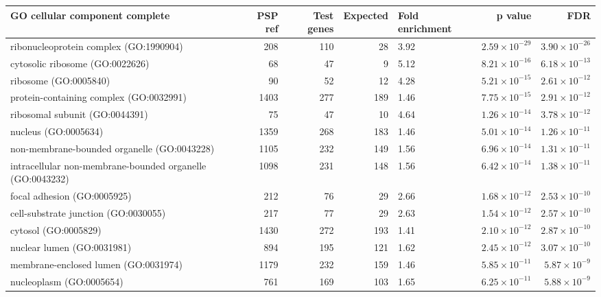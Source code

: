 \begin{table}[ht]
\centering
\begin{adjustbox}{width=\textwidth}

\begin{tabular}{lrrrlrr}
  \hline
GO cellular component complete & PSP ref & Test genes & Expected & Fold enrichment & p value & FDR \\ 
  \hline
ribonucleoprotein complex (GO:1990904) & 208 & 110 & 28 & 3.92 & $2.59 \times 10^{-29}$ & $3.90 \times 10^{-26}$ \\ 
  cytosolic ribosome (GO:0022626) & 68 & 47 & 9 & 5.12 & $8.21 \times 10^{-16}$ & $6.18 \times 10^{-13}$ \\ 
  ribosome (GO:0005840) & 90 & 52 & 12 & 4.28 & $5.21 \times 10^{-15}$ & $2.61 \times 10^{-12}$ \\ 
  protein-containing complex (GO:0032991) & 1403 & 277 & 189 & 1.46 & $7.75 \times 10^{-15}$ & $2.91 \times 10^{-12}$ \\ 
  ribosomal subunit (GO:0044391) & 75 & 47 & 10 & 4.64 & $1.26 \times 10^{-14}$ & $3.78 \times 10^{-12}$ \\ 
  nucleus (GO:0005634) & 1359 & 268 & 183 & 1.46 & $5.01 \times 10^{-14}$ & $1.26 \times 10^{-11}$ \\ 
  non-membrane-bounded organelle (GO:0043228) & 1105 & 232 & 149 & 1.56 & $6.96 \times 10^{-14}$ & $1.31 \times 10^{-11}$ \\ 
  intracellular non-membrane-bounded organelle (GO:0043232) & 1098 & 231 & 148 & 1.56 & $6.42 \times 10^{-14}$ & $1.38 \times 10^{-11}$ \\ 
  focal adhesion (GO:0005925) & 212 & 76 & 29 & 2.66 & $1.68 \times 10^{-12}$ & $2.53 \times 10^{-10}$ \\ 
  cell-substrate junction (GO:0030055) & 217 & 77 & 29 & 2.63 & $1.54 \times 10^{-12}$ & $2.57 \times 10^{-10}$ \\ 
  cytosol (GO:0005829) & 1430 & 272 & 193 & 1.41 & $2.10 \times 10^{-12}$ & $2.87 \times 10^{-10}$ \\ 
  nuclear lumen (GO:0031981) & 894 & 195 & 121 & 1.62 & $2.45 \times 10^{-12}$ & $3.07 \times 10^{-10}$ \\ 
  membrane-enclosed lumen (GO:0031974) & 1179 & 232 & 159 & 1.46 & $5.85 \times 10^{-11}$ & $5.87 \times 10^{-9}$ \\ 
  nucleoplasm (GO:0005654) & 761 & 169 & 103 & 1.65 & $6.25 \times 10^{-11}$ & $5.88 \times 10^{-9}$ \\ 

\end{tabular}
\end{adjustbox}
\end{table}
